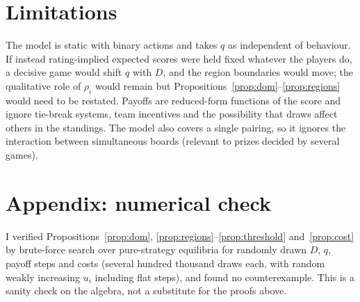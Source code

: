 \documentclass[11pt]{article}
\theoremstyle{definition}
\begin{document}
\section{Limitations}\label{sec:limits}

The model is static with binary actions and takes $q$ as independent of
behaviour. If instead rating-implied expected scores were held fixed whatever
the players do, a decisive game would shift $q$ with $D$, and the
region boundaries would move; the qualitative role of $\rho_i$ would remain
but Propositions~\ref{prop:dom}--\ref{prop:regions} would need to be restated.
Payoffs are reduced-form functions of the score and ignore
tie-break systems, team incentives and the possibility that draws affect
others in the standings. The model also covers a single pairing, so it ignores
the interaction between simultaneous boards (relevant to prizes decided by
several games).

\section*{Appendix: numerical check}

I verified Propositions~\ref{prop:dom}, \ref{prop:regions}--\ref{prop:threshold}
and~\ref{prop:cost} by brute-force search over pure-strategy equilibria for
randomly drawn $D$, $q$, payoff steps and costs (several hundred thousand
draws each, with random weakly increasing $u_i$ including flat steps), and
found no counterexample. This is a sanity check on the algebra, not a
substitute for the proofs above.
\end{document}
